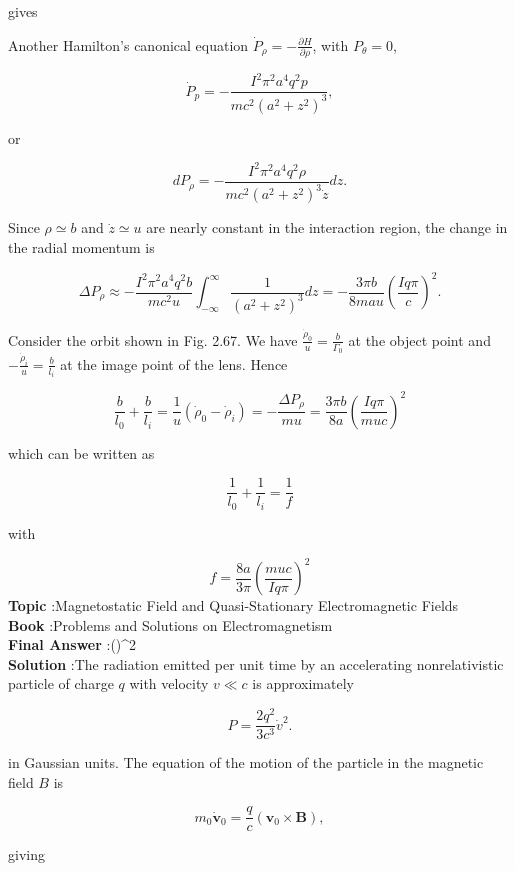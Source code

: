 \documentclass[10pt]{article}
\begin{document}
gives

 Another Hamilton's canonical equation $\dot{P}_{\rho}=-\frac{\partial H}{\partial \rho}$, with $P_{\theta}=0$,

$$
\dot{P}_{p}=-\frac{I^{2} \pi^{2} a^{4} q^{2} p}{m c^{2}\left(a^{2}+z^{2}\right)^{3}},
$$

or

$$
d P_{\rho}=-\frac{I^{2} \pi^{2} a^{4} q^{2} \rho}{m c^{2}\left(a^{2}+z^{2}\right)^{3} \dot{z}} d z .
$$

Since $\rho \simeq b$ and $\dot{z} \simeq u$ are nearly constant in the interaction region, the change in the radial momentum is

$$
\Delta P_{\rho} \approx-\frac{I^{2} \pi^{2} a^{4} q^{2} b}{m c^{2} u} \int_{-\infty}^{\infty} \frac{1}{\left(a^{2}+z^{2}\right)^{3}} d z=-\frac{3 \pi b}{8 m a u}\left(\frac{I q \pi}{c}\right)^{2} .
$$

Consider the orbit shown in Fig. 2.67. We have $\frac{\dot{\rho}_{0}}{u}=\frac{b}{\Gamma_{0}}$ at the object point and $-\frac{\dot{\rho}_{i}}{u}=\frac{b}{l_{i}}$ at the image point of the lens. Hence

$$
\frac{b}{l_{0}}+\frac{b}{l_{i}}=\frac{1}{u}\left(\dot{\rho}_{0}-\dot{\rho}_{i}\right)=-\frac{\Delta P_{\rho}}{m u}=\frac{3 \pi b}{8 a}\left(\frac{I q \pi}{m u c}\right)^{2}
$$

which can be written as

$$
\frac{1}{l_{0}}+\frac{1}{l_{i}}=\frac{1}{f}
$$

with

$$
f=\frac{8 a}{3 \pi}\left(\frac{m u c}{I q \pi}\right)^{2}
$$
\textbf{Topic} :Magnetostatic Field and Quasi-Stationary Electromagnetic Fields\\
\textbf{Book} :Problems and Solutions on Electromagnetism\\
\textbf{Final Answer} :\left(\right)^{2}\\


\textbf{Solution} :The radiation emitted per unit time by an accelerating nonrelativistic particle of charge $q$ with velocity $v \ll c$ is approximately

$$
P=\frac{2 q^{2}}{3 c^{3}} \dot{v}^{2} .
$$

in Gaussian units. The equation of the motion of the particle in the magnetic field $B$ is

$$
m_{0} \dot{\mathbf{v}}_{0}=\frac{q}{c}\left(\mathbf{v}_{0} \times \mathbf{B}\right),
$$

giving
\end{document}
